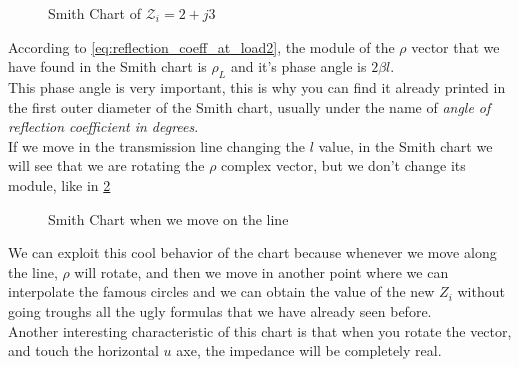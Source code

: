 \begin{figure}[H]
    \begin{center}
    \end{center}\caption{Smith Chart of $\mathcal{Z}_i = 2+j3$}\label{fig:example2_rho} 
\end{figure}
According to \cref{eq:reflection_coeff_at_load2}, the module of the $\rho$ vector that we have found in the Smith chart is $\rho_L$ and it's phase angle is $2\beta l$.\\
This phase angle is very important, this is why you can find it already printed in the first outer diameter of the Smith chart, usually under the name of \emph{angle of reflection coefficient in degrees}.\\
If we move in the transmission line changing the $l$ value, in the Smith chart we will see that we are rotating the $\rho$ complex vector, but we don't change its module, like in \cref{fig:example2_rho2} 
\begin{figure}[H]
    \begin{center}
    \end{center}\caption{Smith Chart when we move on the line}\label{fig:example2_rho2} 
\end{figure}
We can exploit this cool behavior of the chart because whenever we move along the line, $\rho$ will rotate, and then we move in another point where we can interpolate the famous circles and we can obtain the value of the new $Z_i$ without going troughs all the ugly formulas that we have already seen before.\\
Another interesting characteristic of this chart is that when you rotate the vector, and touch the horizontal $u$ axe, the impedance will be completely real.

